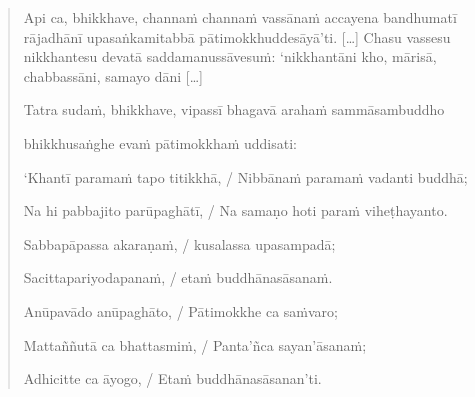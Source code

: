 \documentclass[11pt,oneside]{memoir}
\begin{document}
\begin{quote}
Api ca, bhikkhave, channaṁ channaṁ vassānaṁ accayena bandhumatī rājadhānī
upasaṅkamitabbā pātimokkhuddesāyā’ti. [\ldots{}] Chasu vassesu nikkhantesu devatā
saddamanussāvesuṁ: ‘nikkhantāni kho, mārisā, chabbassāni, samayo dāni [\ldots{}]

Tatra sudaṁ, bhikkhave, vipassī bhagavā arahaṁ sammāsambuddho

bhikkhusaṅghe evaṁ pātimokkhaṁ uddisati:

‘Khantī paramaṁ tapo titikkhā, / Nibbānaṁ paramaṁ vadanti buddhā;

Na hi pabbajito parūpaghātī, / Na samaṇo hoti paraṁ viheṭhayanto.

Sabbapāpassa akaraṇaṁ, / kusalassa upasampadā;

Sacittapariyodapanaṁ, / etaṁ buddhānasāsanaṁ.

Anūpavādo anūpaghāto, / Pātimokkhe ca saṁvaro;

Mattaññutā ca bhattasmiṁ, / Panta'ñca sayan'āsanaṁ;

Adhicitte ca āyogo, / Etaṁ buddhānasāsanan’ti.
\end{quote}

\vspace*{-1pt}
\end{document}
